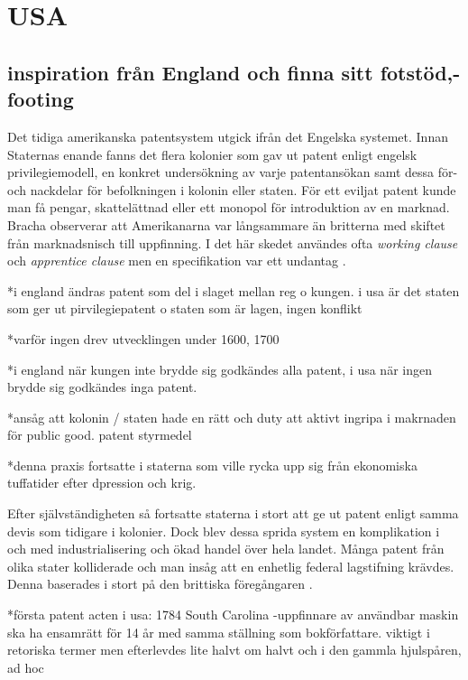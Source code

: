 \section{USA} %

\subsection{inspiration från England och finna sitt fotstöd,- footing} %
\label{sub:inspiration_från_england}

Det tidiga amerikanska patentsystem utgick ifrån det Engelska systemet. Innan
Staternas enande fanns det flera kolonier som gav ut patent enligt engelsk privilegiemodell, en konkret undersökning av varje patentansökan samt dessa för- och nackdelar för befolkningen i kolonin eller staten. För ett eviljat patent kunde man få pengar, skattelättnad eller ett monopol för introduktion av en marknad. Bracha observerar att Amerikanarna var långsammare än britterna med skiftet från marknadsnisch till uppfinning\cite{bracha}. I det här skedet användes ofta \emph{working clause} och \emph{apprentice clause} men en specifikation var ett undantag \cite{bracha}.

*i england ändras patent som del i slaget mellan reg  o kungen. i usa är det staten som ger ut pirvilegiepatent o staten som är lagen, ingen konflikt

*varför ingen drev utvecklingen under 1600, 1700

*i england när kungen inte brydde sig godkändes alla patent, i usa när ingen brydde sig godkändes inga patent.

*ansåg att kolonin / staten hade en rätt och duty att aktivt ingripa i makrnaden för public good. patent styrmedel

*denna praxis fortsatte i staterna som ville rycka upp sig från ekonomiska tuffatider efter dpression och krig.

Efter självständigheten så fortsatte staterna i stort att ge ut patent enligt samma devis som tidigare i kolonier.
Dock blev dessa sprida system en komplikation i och med industrialisering och ökad handel över hela landet.
Många patent från olika stater
kolliderade och man insåg att en enhetlig federal lagstifning krävdes. Denna baserades i stort på den
brittiska föregångaren \cite{nard}.

*första patent acten i usa: 1784 South Carolina -uppfinnare av användbar maskin ska ha ensamrätt för 14 år med samma ställning som bokförfattare. viktigt i retoriska termer men efterlevdes lite halvt om halvt och i den gammla hjulspåren, ad hoc

